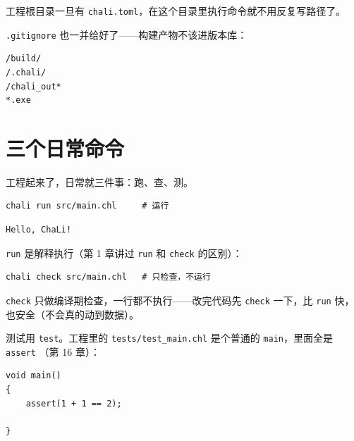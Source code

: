 工程根目录一旦有 \texttt{chali.\allowbreak{}toml}，在这个目录里执行命令就不用反复写路径了。

\texttt{.\allowbreak{}gitignore} 也一并给好了——构建产物不该进版本库：

\par
\medskip
\begin{lstlisting}[style=out]
/build/
/.chali/
/chali_out*
*.exe
\end{lstlisting}
\par
\medskip

\section{三个日常命令}

工程起来了，日常就三件事：跑、查、测。

\par
\medskip
\begin{lstlisting}[style=sh]
chali run src/main.chl     # 运行
\end{lstlisting}
\par
\medskip

\par
\medskip
\begin{lstlisting}[style=out]
Hello, ChaLi!
\end{lstlisting}
\par
\medskip

\texttt{run} 是解释执行（第 1 章讲过 \texttt{run} 和 \texttt{check} 的区别）：

\par
\medskip
\begin{lstlisting}[style=sh]
chali check src/main.chl   # 只检查，不运行
\end{lstlisting}
\par
\medskip

\texttt{check} 只做编译期检查，一行都不执行——改完代码先 \texttt{check} 一下，比 \texttt{run} 快，也安全（不会真的动到数据）。

测试用 \texttt{test}。工程里的 \texttt{tests/\allowbreak{}test\_main.\allowbreak{}chl} 是个普通的 \texttt{main}，里面全是 \texttt{assert} （第 16 章）：

\par
\medskip
\begin{lstlisting}[style=chali]
void main()
{
    assert(1 + 1 == 2);

}
\end{lstlisting}
\par
\medskip

